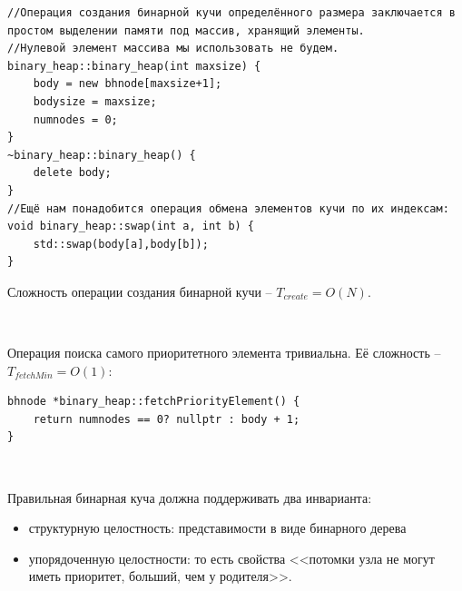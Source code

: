 \documentclass{beamer}
\begin{document}
\begin{frame}[fragile, t]
	\begin{verbatim}
//Операция создания бинарной кучи определённого размера заключается в простом выделении памяти под массив, хранящий элементы. 
//Нулевой элемент массива мы использовать не будем.	
binary_heap::binary_heap(int maxsize) {
	body = new bhnode[maxsize+1];
	bodysize = maxsize;
	numnodes = 0;
}
~binary_heap::binary_heap() {
	delete body;
}
//Ещё нам понадобится операция обмена элементов кучи по их индексам:
void binary_heap::swap(int a, int b) {
	std::swap(body[a],body[b]);
}
	\end{verbatim}
\end{frame}

\begin{frame}[fragile]
	Сложность операции создания бинарной кучи -- $T_{create}=O(N)$.
	
	~
	
	Операция поиска самого приоритетного элемента тривиальна. Её сложность -- $T_{fetchMin}=O(1)$:
	\begin{verbatim}
bhnode *binary_heap::fetchPriorityElement() {
	return numnodes == 0? nullptr : body + 1;
}
	\end{verbatim}
	
	~
	
	Правильная бинарная куча должна поддерживать два инварианта:
	\begin{itemize}
		\item структурную целостность: представимости в виде бинарного дерева
		\item упорядоченную целостности: то есть свойства <<потомки узла не могут иметь приоритет, больший, чем у родителя>>. 
	\end{itemize}	
\end{frame}
\end{document}
